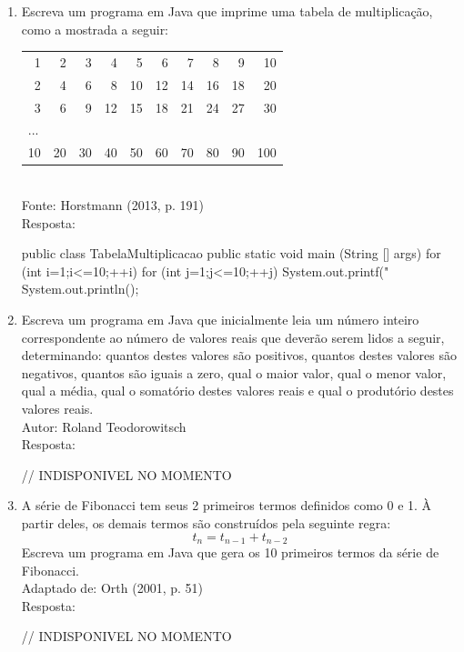 \documentclass[onecolumn,a4paper,10pt]{report}
\newcommand{\+}{\, + \,}
\newcommand{\<}{\hspace*{-0.4cm}}
\begin{document}
\begin{enumerate}[1.]
\item Escreva um programa em Java que imprime uma tabela de multiplicação, como a mostrada a seguir:\\
\begin{tabular}{rrrrrrrrrr}
1 & 2 & 3 & 4 & 5 & 6 & 7 & 8 & 9 & 10\\
2 & 4 & 6 & 8 & 10 & 12 & 14 & 16 & 18 & 20\\
3 & 6 & 9 & 12 & 15 & 18 & 21 & 24 & 27 & 30\\
\multicolumn{10}{l}{...}\\
10 & 20 & 30 & 40 & 50 & 60 & 70 & 80 & 90 & 100\\
\end{tabular}\\
{\tiny Fonte: Horstmann (2013, p. 191)}\\
Resposta:\\
\begin{javacode}
public class TabelaMultiplicacao {
    public static void main (String [] args) {
        for (int i=1;i<=10;++i) {
            for (int j=1;j<=10;++j) {
                System.out.printf("%
            }
            System.out.println();
        }
    }
}
\end{javacode}

\item Escreva um programa em Java que inicialmente leia um número inteiro correspondente ao número de valores reais que deverão serem lidos a seguir, determinando: quantos destes valores são positivos, quantos destes valores são negativos, quantos são iguais a zero, qual o maior valor, qual o menor valor, qual a média, qual o somatório destes valores reais e qual o produtório destes valores reais.\\
{\tiny Autor: Roland Teodorowitsch}\\
Resposta:\\
\begin{javacode}
// INDISPONIVEL NO MOMENTO
\end{javacode}

\item A série de Fibonacci tem seus 2 primeiros termos definidos como 0 e 1. À partir deles, os demais termos são construídos pela seguinte regra:
\[ t_n = t_{n-1} + t_{n-2}\]
Escreva um programa em Java que gera os 10 primeiros termos da série de Fibonacci.\\
{\tiny Adaptado de: Orth (2001, p. 51)}\\
Resposta:\\
\begin{javacode}
// INDISPONIVEL NO MOMENTO
\end{javacode}


\end{enumerate}
\end{document}
